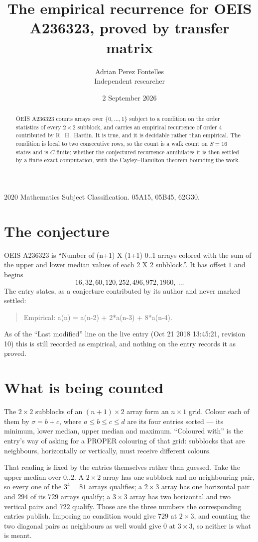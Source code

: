 \documentclass[11pt,a4paper]{article}
\title{The empirical recurrence for OEIS A236323, proved by transfer matrix}
\author{Adrian Perez Fontelles\\ \small Independent researcher}
\date{2 September 2026}
\theoremstyle{plain}
\theoremstyle{definition}
\begin{document}
\maketitle

\begin{abstract}
OEIS A236323 counts arrays over $\{0,\dots,1\}$ subject to a condition on the order
statistics of every $2\times2$ subblock, and carries an empirical recurrence of order
$4$ contributed by R.~H.~Hardin. It is true, and it is decidable rather than empirical.
The condition is local to two consecutive rows, so the count is a walk count on $S=16$
states and is $C$-finite; whether the conjectured recurrence annihilates it is then settled by
a finite exact computation, with the Cayley--Hamilton theorem bounding the work.
\end{abstract}

\noindent\small 2020 Mathematics Subject Classification. 05A15, 05B45, 62G30.\normalsize

\section{The conjecture}

OEIS A236323 is ``Number of (n+1) X (1+1) 0..1 arrays colored with the sum of the upper and lower median values of each 2 X 2 subblock.''. It has offset $1$ and begins
\[
16, 32, 60, 120, 252, 496, 972, 1960,\ \dots
\]
The entry states, as a conjecture contributed by its author and never marked settled:
\begin{quote}
Empirical: a(n) = a(n-2) + 2*a(n-3) + 8*a(n-4).
\end{quote}
As of the ``Last modified'' line on the live entry (Oct 21 2018 13:45:21, revision 10) this is still
recorded as empirical, and nothing on the entry records it as proved.

\section{What is being counted}

The $2\times2$ subblocks of an $(n+1)\times2$ array form an
$n\times1$ grid. Colour each of them by $\sigma=b+c$, where $a\le b\le c\le d$ are its four entries sorted --- its minimum, lower median, upper median and maximum. ``Coloured with'' is the entry's way of
asking for a PROPER colouring of that grid: subblocks that are neighbours, horizontally or
vertically, must receive different colours.

That reading is fixed by the entries themselves rather than guessed. Take the upper median
over $0..2$. A $2\times2$ array has one subblock and no neighbouring pair, so every one of the
$3^4=81$ arrays qualifies; a $2\times3$ array has one horizontal pair and $294$ of its $729$
arrays qualify; a $3\times3$ array has two horizontal and two vertical pairs and $722$
qualify. Those are the three numbers the corresponding entries publish. Imposing no condition
would give $729$ at $2\times3$, and counting the two diagonal pairs as neighbours as well
would give $0$ at $3\times3$, so neither is what is meant.
\end{document}
